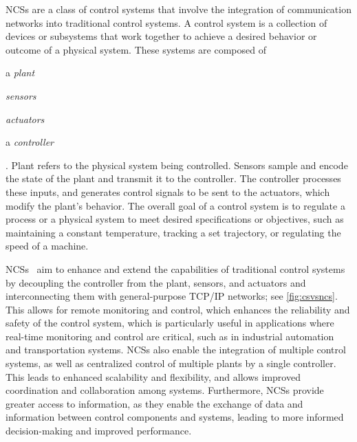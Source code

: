 \glspl{NCS} are a class of control systems that involve the integration of communication networks into traditional control systems.
A control system is a collection of devices or subsystems that work together to achieve a desired behavior or outcome of a physical system.
These systems are composed of
\begin{inlineenum}
    \item a \emph{plant}
    \item \emph{sensors}
    \item \emph{actuators}
    \item a \emph{controller}
\end{inlineenum}.
Plant refers to the physical system being controlled.
Sensors sample and encode the state of the plant and transmit it to the controller.
The controller processes these inputs, and generates control signals to be sent to the actuators, which modify the plant's behavior.
The overall goal of a control system is to regulate a process or a physical system to meet desired specifications or objectives, such as maintaining a constant temperature, tracking a set trajectory, or regulating the speed of a machine.

\glspl{NCS}~\cite{gupta2010networked} aim to enhance and extend the capabilities of traditional control systems by decoupling the controller from the plant, sensors, and actuators and interconnecting them with general-purpose \acs{TCP}/\acs{IP} networks;
see \cref{fig:csvsncs}.
This allows for remote monitoring and control, which enhances the reliability and safety of the control system, which is particularly useful in applications where real-time monitoring and control are critical, such as in industrial automation and transportation systems.
\glspl{NCS} also enable the integration of multiple control systems, as well as centralized control of multiple plants by a single controller.
This leads to enhanced scalability and flexibility, and allows improved coordination and collaboration among systems.
Furthermore, \glspl{NCS} provide greater access to information, as they enable the exchange of data and information between control components and systems, leading to more informed decision-making and improved performance.

